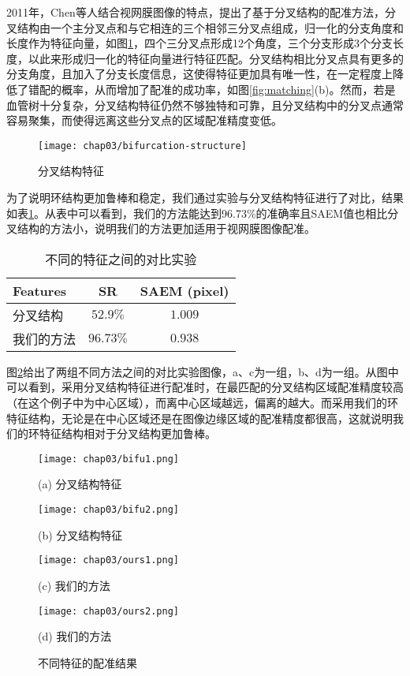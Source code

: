 2011年，Chen\cite{chen2011retinal,chen2015retinal}等人结合视网膜图像的特点，提出了基于分叉结构的配准方法，分叉结构由一个主分叉点和与它相连的三个相邻三分叉点组成，归一化的分支角度和长度作为特征向量，如图\ref{fig:bifurcation structure}，四个三分叉点形成12个角度，三个分支形成3个分支长度，以此来形成归一化的特征向量进行特征匹配。分叉结构相比分叉点具有更多的分支角度，且加入了分支长度信息，这使得特征更加具有唯一性，在一定程度上降低了错配的概率，从而增加了配准的成功率，如图\ref{fig:matching}(b)。然而，若是血管树十分复杂，分叉结构特征仍然不够独特和可靠，且分叉结构中的分叉点通常容易聚集，而使得远离这些分叉点的区域配准精度变低。

\begin{figure}
  \centering
  \texttt{[image: chap03/bifurcation-structure]}
  \caption{分叉结构特征}
  \label{fig:bifurcation structure}
\end{figure}

为了说明环结构更加鲁棒和稳定，我们通过实验与分叉结构特征进行了对比，结果如表\ref{tab:methods}。从表中可以看到，我们的方法能达到96.73\%的准确率且SAEM值也相比分叉结构的方法小，说明我们的方法更加适用于视网膜图像配准。

\begin{table}
\caption{不同的特征之间的对比实验}
\centering
\begin{tabular}{lcc}
\toprule
Features & SR & SAEM (pixel)\\
\midrule
分叉结构 & $52.9\%$ & $1.009$\\
我们的方法 & $\mathbf{96.73\%}$ & $\mathbf{0.938}$\\
\bottomrule
\end{tabular}
\label{tab:methods}
\end{table}
图\ref{fig:methods-fig}给出了两组不同方法之间的对比实验图像，a、c为一组，b、d为一组。从图中可以看到，采用分叉结构特征进行配准时，在最匹配的分叉结构区域配准精度较高（在这个例子中为中心区域），而离中心区域越远，偏离的越大。而采用我们的环特征结构，无论是在中心区域还是在图像边缘区域的配准精度都很高，这就说明我们的环特征结构相对于分叉结构更加鲁棒。
\begin{figure}[H]
\centering
\begin{minipage}[b]{0.48\textwidth} 
      \centering 
      \texttt{[image: chap03/bifu1.png]}
        \centerline{(a) 分叉结构特征}\medskip
\end{minipage}
  \begin{minipage}[b]{0.48\textwidth}
    \centering
    \texttt{[image: chap03/bifu2.png]}
      \centerline{(b) 分叉结构特征}\medskip
  \end{minipage}
\begin{minipage}[b]{0.48\textwidth}
	\centering
      \texttt{[image: chap03/ours1.png]}
        \centerline{(c) 我们的方法}\medskip
    \end{minipage}
  \begin{minipage}[b]{0.48\textwidth}
    \centering
    \texttt{[image: chap03/ours2.png]}
      \centerline{(d) 我们的方法}\medskip
  \end{minipage}
\caption{不同特征的配准结果}
\label{fig:methods-fig}
\end{figure}

